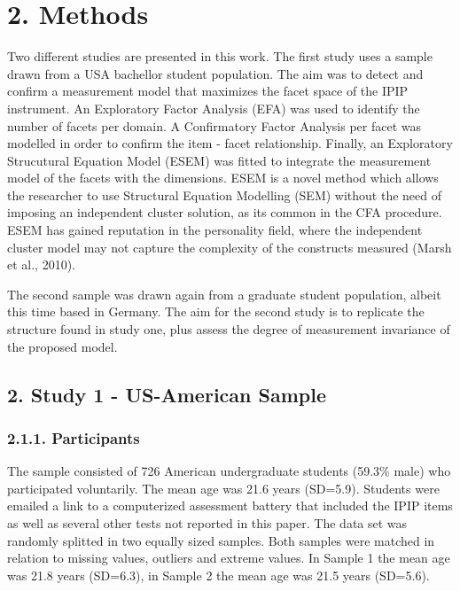 \documentclass[man]{apa6}
\theoremstyle{definition}
\theoremstyle{definition}
\theoremstyle{definition}
\theoremstyle{remark}
\begin{document}
\hypertarget{methods}{%
\section{2. Methods}\label{methods}}

Two different studies are presented in this work. The first study uses a
sample drawn from a USA bachellor student population. The aim was to
detect and confirm a measurement model that maximizes the facet space of
the IPIP instrument. An Exploratory Factor Analysis (EFA) was used to
identify the number of facets per domain. A Confirmatory Factor Analysis
per facet was modelled in order to confirm the item - facet
relationship. Finally, an Exploratory Strucutural Equation Model (ESEM)
was fitted to integrate the measurement model of the facets with the
dimensions. ESEM is a novel method which allows the researcher to use
Structural Equation Modelling (SEM) without the need of imposing an
independent cluster solution, as its common in the CFA procedure. ESEM
has gained reputation in the personality field, where the independent
cluster model may not capture the complexity of the constructs measured
(Marsh et al., 2010).

The second sample was drawn again from a graduate student population,
albeit this time based in Germany. The aim for the second study is to
replicate the structure found in study one, plus assess the degree of
measurement invariance of the proposed model.

\hypertarget{study-1---us-american-sample}{%
\subsection{2. Study 1 - US-American
Sample}\label{study-1---us-american-sample}}

\hypertarget{participants}{%
\subsubsection{2.1.1. Participants}\label{participants}}

The sample consisted of 726 American undergraduate students (59.3\%
male) who participated voluntarily. The mean age was 21.6 years
(SD=5.9). Students were emailed a link to a computerized assessment
battery that included the IPIP items as well as several other tests not
reported in this paper. The data set was randomly splitted in two
equally sized samples. Both samples were matched in relation to missing
values, outliers and extreme values. In Sample 1 the mean age was 21.8
years (SD=6.3), in Sample 2 the mean age was 21.5 years (SD=5.6).
\end{document}
